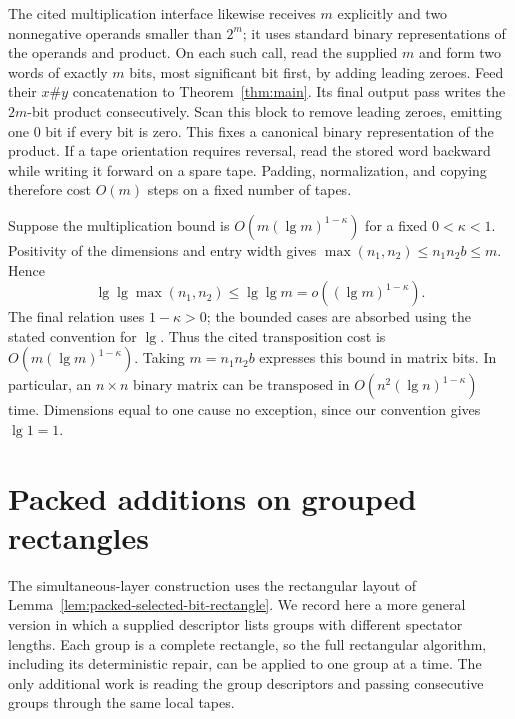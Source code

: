 \documentclass[11pt]{article}
\theoremstyle{definition}
\begin{document}
The cited multiplication interface likewise receives $m$ explicitly
and two nonnegative operands smaller than $2^m$; it uses standard binary
representations of the operands and product. On each such call, read the
supplied $m$ and form two words
of exactly $m$ bits, most significant bit first, by adding leading zeroes.
Feed their $x\#y$ concatenation to Theorem~\ref{thm:main}. Its final
output pass writes the $2m$-bit product consecutively. Scan this block
to remove leading zeroes, emitting one $0$ bit if every bit is zero.
This fixes a canonical binary representation of the product.
If a tape orientation requires reversal, read the stored word backward
while writing it forward on a spare tape. Padding, normalization, and
copying therefore cost $O(m)$ steps on a fixed number of tapes.

Suppose the multiplication bound is $O(m(\lg m)^{1-\kappa})$ for a
fixed $0<\kappa<1$.  Positivity of the dimensions and entry width gives
$\max(n_1,n_2)\le n_1n_2b\le m$.  Hence
\[
 \lg\lg\max(n_1,n_2)\le\lg\lg m
   =o((\lg m)^{1-\kappa}).
\]
The final relation uses $1-\kappa>0$; the bounded cases are absorbed
using the stated convention for $\lg$.  Thus the cited transposition
cost is $O(m(\lg m)^{1-\kappa})$.  Taking $m=n_1n_2b$ expresses this
bound in matrix bits. In particular, an
$n\times n$ binary matrix can be transposed in
$O(n^2(\lg n)^{1-\kappa})$ time. Dimensions equal to one cause no
exception, since our convention gives $\lg1=1$.
 \appendix
\section{Packed additions on grouped rectangles}
\label{sec:grouped-rectangles}

The simultaneous-layer construction uses the rectangular layout of
Lemma~\ref{lem:packed-selected-bit-rectangle}. We record here a more
general version in which a supplied descriptor lists groups with different
spectator lengths. Each group is a complete rectangle, so the full
rectangular algorithm, including its deterministic repair, can be applied
to one group at a time. The only additional work is reading the group
descriptors and passing consecutive groups through the same local tapes.
\end{document}
